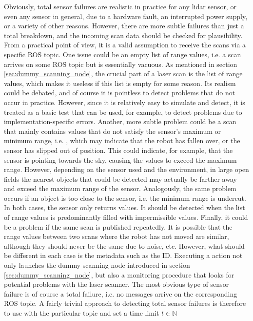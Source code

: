 \documentclass[english, master, utf8]{base/thesis_KBS}
\newcommand{\code}{\collectverb{\codebox}}
\begin{document}
Obviously, total sensor failures are realistic in practice for any lidar sensor, or even any sensor in general, due to a hardware fault, an interrupted
power supply, or a variety of other reasons. However, there are more subtle failures than just a total breakdown, and the incoming scan data should be checked for plausibility.
From a practical point of view, it is a valid assumption to receive the scans via a specific ROS topic. One issue could be an empty list of range values, i.e. a scan arrives on
some ROS topic but is essentially vacuous. As mentioned in section \ref{sec:dummy_scanning_node}, the crucial part of a laser scan is the list of range values, which makes it 
useless if this list is empty for some reason. Its realism could be debated, and of course it is pointless to detect problems that do not occur in practice. However, since it is
relatively easy to simulate and detect, it is treated as a basic test that can be used, for example, to detect problems due to implementation-specific errors.
Another, more subtle problem could be a scan that mainly contains values that do not satisfy the sensor's maximum or minimum range, i.e. \code{inf}, which may indicate that
the robot has fallen over, or the sensor has slipped out of position. This could indicate, for example, that the sensor is pointing towards the sky, causing the values to exceed
the maximum range. However, depending on the sensor used and the environment, in large open fields the nearest objects that could be detected may actually be farther away and exceed
the maximum range of the sensor. Analogously, the same problem occurs if an object is too close to the sensor, i.e. the minimum range is undercut. In both cases, the sensor only
returns \code{inf} values. It should be detected when the list of range values is predominantly filled with impermissible \code{inf} values. Finally, it could be a problem if the
same scan is published repeatedly. It is possible that the range values between two scans where the robot has not moved are similar, although they should never be the same due to
noise, etc. However, what should be different in each case is the metadata such as the ID.\newline
Executing a \code{scan} action not only launches the dummy scanning node introduced in section \ref{sec:dummy_scanning_node}, but also a monitoring procedure that
looks for potential problems with the laser scanner. The most obvious type of sensor failure is of course a total failure, i.e. no messages arrive on the corresponding ROS topic.
A fairly trivial approach to detecting total sensor failures is therefore to use \code{rospy.wait_for_message()} with the particular topic and set a time limit $t \in \mathbb{N}$
\end{document}

